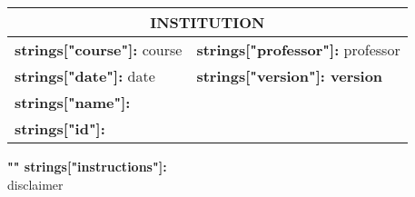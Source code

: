 \documentclass{exam}
\begin{document}
\begin{large}  
\begin{center}
\renewcommand{\arraystretch}{1.2}
\begin{tabularx}{0.9\linewidth}{|X|X|}
\hline
\multicolumn{2}{|c|}{\uppercase{ \bf {{institution}} }}\\ \hline
\textbf{ {{strings["course"]}}:} {{course}} &
\textbf{ {{strings["professor"]}}:} {{professor}}       \\ \hline
\textbf{ {{strings["date"]}}:} {{date}}    &
\textbf{ {{strings["version"]}}: {{version}}  }                       \\ \hline
\multicolumn{2}{|l|}{\textbf{ {{strings["name"]}}:} } \\ \hline
\multicolumn{2}{|l|}{\textbf{ {{strings["id"]}}: }   }       \\
\hline
\end{tabularx}
\end{center}
\end{large}  


\vspace{5mm}
\noindent
\textbf{{ "{" }}{{strings["instructions"]}}:}\\
{{disclaimer}}
\end{document}
